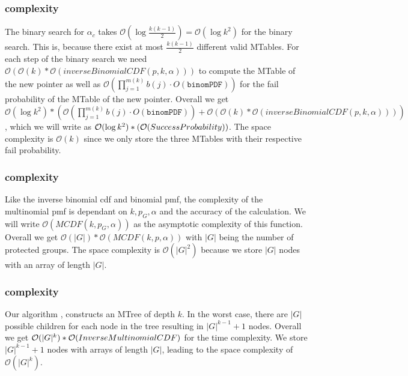 \subsubsection{\algoBinomBinary complexity}\label{subsubsec:binom-binary-complexity}
The binary search for $\alpha_c$ takes $\mathcal{O}(\log{}\frac{k(k-1)}{2}) = \mathcal{O}(\log{}k^2)$ for the binary search. This is, because there exist at most $\frac{k(k-1)}{2}$ different valid MTables. For each step of the binary search we need $\mathcal{O}(\mathcal{O}(k) * \mathcal{O}(inverseBinomialCDF(p,k,\alpha)))$ to compute the MTable of the new pointer as well as $\mathcal{O}(\prod_{j=1}^{m(k)}b(j) \cdot O(\texttt{binomPDF}))$ for the fail probability of the MTable of the new pointer. Overall we get $\mathcal{O}(\log{}k^2) * (\mathcal{O}(\prod_{j=1}^{m(k)}b(j) \cdot O(\texttt{binomPDF})) + \mathcal{O}(\mathcal{O}(k) * \mathcal{O}(inverseBinomialCDF(p,k,\alpha))))$, which we will write as $\mathcal{O}(\log{}k^2) * (\mathcal{O}({\sc SuccessProbability}))$. The space complexity is $\mathcal{O}(k)$ since we only store the three MTables with their respective fail probability.
\subsubsection{\algoImcdf complexity}\label{subsubsec:imcdf-complexity}
Like the inverse binomial cdf and binomial pmf, the complexity of the multinomial pmf is dependant on $k,p_G , \alpha$ and the accuracy of the calculation. We will write $\mathcal{O}(MCDF(k,p_G,\alpha))$ as the asymptotic complexity of this function.
Overall we get $\mathcal{O}(|G|) * \mathcal{O}(MCDF(k,p,\alpha ))$ with $|G|$ being the number of protected groups. The space complexity is $\mathcal{O}(|G|^2)$ because we store $|G|$ nodes with an array of length $|G|$.
\subsubsection{\algoComputeMTree complexity}\label{subsubsec:mtree-complexity}
Our algorithm \algoComputeMTree , constructs an MTree of depth $k$. In the worst case, there are $|G|$ possible children for each node in the tree resulting in $|G|^{k-1} +1$ nodes. Overall we get $\mathcal{O}(|G|^{k}) * \mathcal{O}({\sc InverseMultinomialCDF})$ for the time complexity. We store $|G|^{k-1} +1$ nodes with arrays of length $|G|$, leading to the space complexity of $\mathcal{O}(|G|^{k})$.
